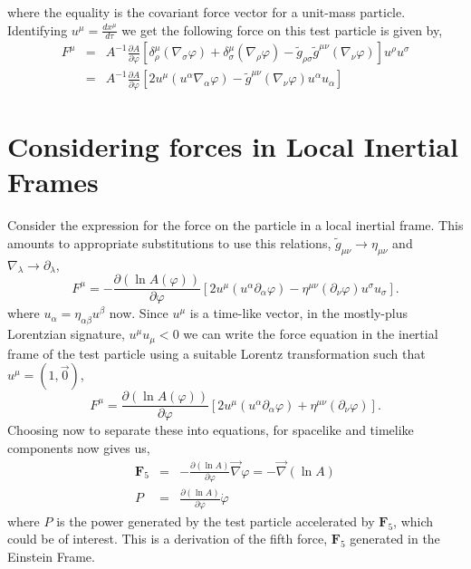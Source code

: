 where the equality is the covariant force vector for a unit-mass particle. Identifying $u^{\mu} = \frac{dx^{\mu}}{d\tau}$ we get the following force on this test particle is given by,
\begin{eqnarray}
    F^{\mu} &=& A^{-1}\frac{\partial A}{\partial\varphi}\left[\delta^{\mu}_{\rho}(\nabla_{\sigma}\varphi) + \delta^{\mu}_{\sigma}(\nabla_{\rho}\varphi) - \tilde{g}_{\rho\sigma}\tilde{g}^{\mu\nu}(\nabla_{\nu}\varphi)\right]u^{\rho}u^{\sigma} \\
    &=& A^{-1}\frac{\partial A}{\partial\varphi}\left[2u^{\mu}(u^{\alpha}\nabla_{\alpha}\varphi) - \tilde{g}^{\mu\nu}(\nabla_{\nu}\varphi)u^{\alpha}u_{\alpha}\right]
\end{eqnarray}
\section{Considering forces in Local Inertial Frames}
Consider the expression for the force on the particle in a local inertial frame. This amounts to appropriate substitutions to use this relations, $\tilde{g}_{\mu\nu} \rightarrow \eta_{\mu\nu}$ and $\nabla_{\lambda}\rightarrow\partial_{\lambda}$,
\begin{equation}
    F^{\mu} =  -\frac{\partial (\ln A(\varphi))}{\partial\varphi}\left[2u^{\mu}(u^{\alpha}\partial_{\alpha}\varphi) - \eta^{\mu\nu}(\partial_{\nu}\varphi)u^{\sigma}u_{\sigma}\right].
\end{equation}
where $u_{\alpha}= \eta_{\alpha\beta}u^{\beta}$ now. Since $u^{\mu}$ is a time-like vector, in the mostly-plus Lorentzian signature, $u^{\mu}u_{\mu} < 0$ we can write the force equation in the inertial frame of the test particle using a suitable Lorentz transformation such that $u^{\mu} = (1, \vec{0})$, 
\begin{equation}
    F^{\mu} = \frac{\partial (\ln A(\varphi))}{\partial\varphi}\left[2u^{\mu}(u^{\alpha}\partial_{\alpha}\varphi) + \eta^{\mu\nu}(\partial_{\nu}\varphi)\right].
\end{equation}
Choosing now to separate these into equations, for spacelike and timelike components now gives us,
\begin{eqnarray}
    \mathbf{F}_5 &=& -\frac{\partial (\ln A)}{\partial \varphi}\vec{\nabla}\varphi =-\vec{\nabla}\left(\ln A\right)\\
    P &=& \frac{\partial (\ln A)}{\partial \varphi}\dot{\varphi}
\end{eqnarray}
where $P$ is the power generated by the test particle accelerated by $\mathbf{F}_5$, which could be of interest. This is a derivation of the fifth force, $\mathbf{F}_5$ generated in the Einstein Frame.   


